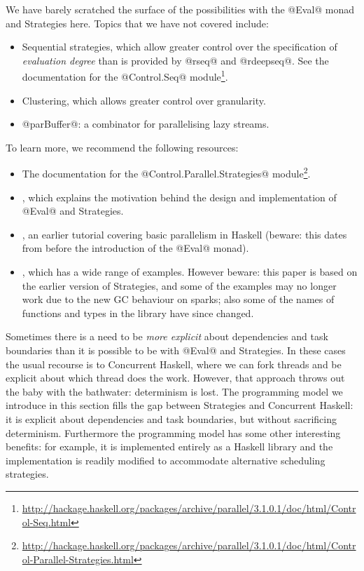 
We have barely scratched the surface of the possibilities with the
@Eval@ monad and Strategies here.  Topics that we have not covered
include:

\begin{itemize}
\item Sequential strategies, which allow greater control over the
  specification of \emph{evaluation degree} than is provided by @rseq@
  and @rdeepseq@.  See the documentation for the @Control.Seq@ module\footnote{\url{http://hackage.haskell.org/packages/archive/parallel/3.1.0.1/doc/html/Control-Seq.html}}.
\item Clustering, which allows greater control over granularity.
\item @parBuffer@: a combinator for parallelising lazy streams.
\end{itemize}

To learn more, we recommend the following resources:

\begin{itemize}
\item The documentation for the {\small @Control.Parallel.Strategies@} module\footnote{\url{http://hackage.haskell.org/packages/archive/parallel/3.1.0.1/doc/html/Control-Parallel-Strategies.html}}.
\item \citet{seq-no-more}, which explains the motivation behind the
  design and implementation of @Eval@ and Strategies.
\item \citet{pjsingh-tutorial}, an earlier tutorial covering
  basic parallelism in Haskell (beware: this dates from before the
  introduction of the @Eval@ monad).
\item \citet{trinder:strategies}, which has a wide range of examples.
  However beware: this paper is based on the earlier version of
  Strategies, and some of the examples may no longer work due to the
  new GC behaviour on sparks; also some of the names of functions and
  types in the library have since changed.
\end{itemize}


Sometimes there is a need to be \emph{more explicit} about
dependencies and task boundaries than it is possible to be with @Eval@
and Strategies.  In these cases the usual recourse is to Concurrent
Haskell, where we can fork threads and be explicit about which thread
does the work.  However, that approach throws out the baby with the
bathwater: determinism is lost.  The programming model we introduce in
this section fills the gap between Strategies and Concurrent Haskell:
it is explicit about dependencies and task boundaries, but without
sacrificing determinism.  Furthermore the programming model has some
other interesting benefits: for example, it is implemented entirely as
a Haskell library and the implementation is readily modified to
accommodate alternative scheduling strategies.

